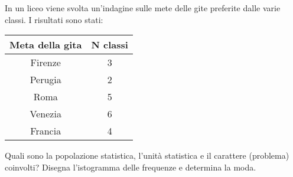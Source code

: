 \item In un liceo viene svolta un'indagine sulle mete delle gite preferite dalle varie classi. I risultati sono stati: 	\newline
		\begin{center}
				\begin{tabular}{|c|c|}
				\hline
				Meta della gita & N classi \\
				\hline
				Firenze & 3 \\
				Perugia & 2 \\
				Roma  	& 5 \\
				Venezia	& 6 \\
				Francia	& 4 \\
				\hline
			\end{tabular}
		\end{center}
		Quali sono la popolazione statistica, l'unità statistica e il carattere (problema) coinvolti?\newline
		Disegna l'istogramma delle frequenze e determina la moda.